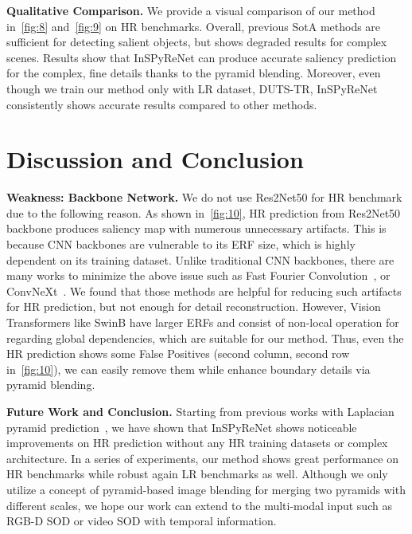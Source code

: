 \documentclass{llncs}
\begin{document}
    \noindent
    \textbf{Qualitative Comparison.}
    We provide a visual comparison of our method in~\cref{fig:8} and~\cref{fig:9} on HR benchmarks. 
    Overall, previous SotA methods are sufficient for detecting salient objects, but shows degraded results for complex scenes.
    Results show that InSPyReNet can produce accurate saliency prediction for the complex, fine details thanks to the pyramid blending.
    Moreover, even though we train our method only with LR dataset, DUTS-TR, InSPyReNet consistently shows accurate results compared to other methods.
 
\section{Discussion and Conclusion}
\label{sec:disc}

    \noindent
    \textbf{Weakness: Backbone Network.} We do not use Res2Net50 for HR benchmark due to the following reason. 
    As shown in~\cref{fig:10}, HR prediction from Res2Net50 backbone produces saliency map with numerous unnecessary artifacts.
    This is because CNN backbones are vulnerable to its ERF size, which is highly dependent on its training dataset.
    Unlike traditional CNN backbones, there are many works to minimize the above issue such as Fast Fourier Convolution~\cite{chi2020ffc}, or ConvNeXt~\cite{liu2022convnet}.
    We found that those methods are helpful for reducing such artifacts for HR prediction, but not enough for detail reconstruction.
    However, Vision Transformers like SwinB have larger ERFs and consist of non-local operation for regarding global dependencies, which are suitable for our method.
    Thus, even the HR prediction shows some False Positives (second column, second row in~\cref{fig:10}), we can easily remove them while enhance boundary details via pyramid blending. 

    \noindent
    \textbf{Future Work and Conclusion.} Starting from previous works with Laplacian pyramid prediction~\cite{ghiasi2016laplacian,chen2018reverse}, 
    we have shown that InSPyReNet shows noticeable improvements on HR prediction without any HR training datasets or complex architecture.
    In a series of experiments, our method shows great performance on HR benchmarks while robust again LR benchmarks as well.
    Although we only utilize a concept of pyramid-based image blending for merging two pyramids with different scales,
    we hope our work can extend to the multi-modal input such as RGB-D SOD or video SOD with temporal information.
        
\end{document}
